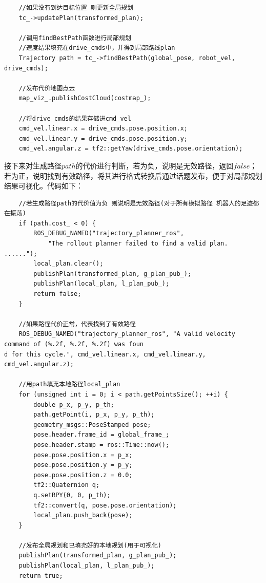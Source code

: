 \documentclass[9pt, oneside]{book}
\begin{document}
\small
\begin{verbatim}
    //如果没有到达目标位置 则更新全局规划
    tc_->updatePlan(transformed_plan);

    //调用findBestPath函数进行局部规划
    //速度结果填充在drive_cmds中，并得到局部路线plan
    Trajectory path = tc_->findBestPath(global_pose, robot_vel, drive_cmds);

    //发布代价地图点云
    map_viz_.publishCostCloud(costmap_);

    //将drive_cmds的结果存储进cmd_vel
    cmd_vel.linear.x = drive_cmds.pose.position.x;
    cmd_vel.linear.y = drive_cmds.pose.position.y;
    cmd_vel.angular.z = tf2::getYaw(drive_cmds.pose.orientation);
\end{verbatim}
\normalsize

接下来对生成路径$path$的代价进行判断，若为负，说明是无效路径，返回$false$；若为正，说明找到有效路径，将其进行格式转换后通过话题发布，便于对局部规划结果可视化。代码如下：

\footnotesize
\begin{verbatim}
    //若生成路径path的代价值为负 则说明是无效路径(对于所有模拟路径 机器人的足迹都在振荡)
    if (path.cost_ < 0) {
        ROS_DEBUG_NAMED("trajectory_planner_ros",
            "The rollout planner failed to find a valid plan. ......");
        local_plan.clear();
        publishPlan(transformed_plan, g_plan_pub_);
        publishPlan(local_plan, l_plan_pub_);
        return false;
    }

    //如果路径代价正常，代表找到了有效路径
    ROS_DEBUG_NAMED("trajectory_planner_ros", "A valid velocity command of (%.2f, %.2f, %.2f) was foun
d for this cycle.", cmd_vel.linear.x, cmd_vel.linear.y, cmd_vel.angular.z);

    //用path填充本地路径local_plan
    for (unsigned int i = 0; i < path.getPointsSize(); ++i) {
        double p_x, p_y, p_th;
        path.getPoint(i, p_x, p_y, p_th);
        geometry_msgs::PoseStamped pose;
        pose.header.frame_id = global_frame_;
        pose.header.stamp = ros::Time::now();
        pose.pose.position.x = p_x;
        pose.pose.position.y = p_y;
        pose.pose.position.z = 0.0;
        tf2::Quaternion q;
        q.setRPY(0, 0, p_th);
        tf2::convert(q, pose.pose.orientation);
        local_plan.push_back(pose);
    }

    //发布全局规划和已填充好的本地规划(用于可视化)
    publishPlan(transformed_plan, g_plan_pub_);
    publishPlan(local_plan, l_plan_pub_);
    return true;
\end{verbatim}
\normalsize
\end{document}
